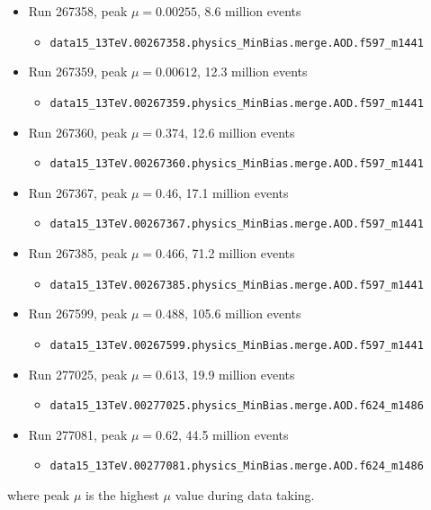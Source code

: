 \begin{itemize}

\item Run 267358, peak $\mu=0.00255$, 8.6 million events
\begin{itemize}[leftmargin=*]
\item[] \verb|data15_13TeV.00267358.physics_MinBias.merge.AOD.f597_m1441|
\end{itemize}

\item Run 267359, peak $\mu=0.00612$, 12.3 million events
\begin{itemize}[leftmargin=*]
\item[] \verb|data15_13TeV.00267359.physics_MinBias.merge.AOD.f597_m1441|
\end{itemize}

\item Run 267360, peak $\mu=0.374$, 12.6 million events
\begin{itemize}[leftmargin=*]
\item[] \verb|data15_13TeV.00267360.physics_MinBias.merge.AOD.f597_m1441|
\end{itemize}

\item Run 267367, peak $\mu=0.46$, 17.1 million events
\begin{itemize}[leftmargin=*]
\item[] \verb|data15_13TeV.00267367.physics_MinBias.merge.AOD.f597_m1441|
\end{itemize}

\item Run 267385, peak $\mu=0.466$, 71.2 million events
\begin{itemize}[leftmargin=*]
\item[] \verb|data15_13TeV.00267385.physics_MinBias.merge.AOD.f597_m1441|
\end{itemize}

\item Run 267599, peak $\mu=0.488$, 105.6 million events
\begin{itemize}[leftmargin=*]
\item[] \verb|data15_13TeV.00267599.physics_MinBias.merge.AOD.f597_m1441|
\end{itemize}

\item Run 277025, peak $\mu=0.613$, 19.9 million events
\begin{itemize}[leftmargin=*]
\item[] \verb|data15_13TeV.00277025.physics_MinBias.merge.AOD.f624_m1486|
\end{itemize}

\item Run 277081, peak $\mu=0.62$, 44.5 million events
\begin{itemize}[leftmargin=*]
\item[] \verb|data15_13TeV.00277081.physics_MinBias.merge.AOD.f624_m1486|
\end{itemize}

\end{itemize}
where peak $\mu$ is the highest $\mu$ value during data taking.

